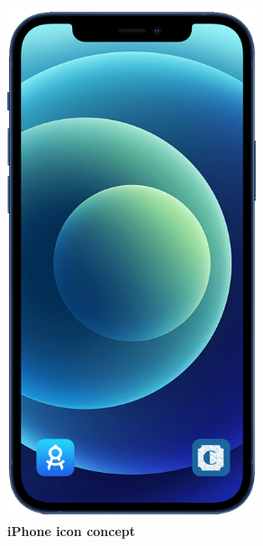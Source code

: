 \begin{itemize}
\begin{figure}[!htb]
\begin{minipage}{0.4\textwidth}
\includegraphics[width=0.65\textwidth]{Images/App/iPhone_AppIcon}
\captionsetup{justification=centering}
\caption{\label{fig:iphoneappicon}\textbf{iPhone icon concept}}
\end{minipage}
\end{figure}


\end{itemize}
